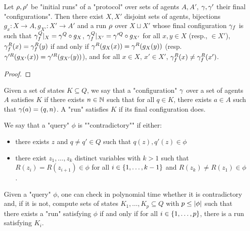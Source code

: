 \begin{lemma}[Copycat]\label{lem:copycat}
	Let $\rho, \rho'$ be "initial runs" of a "protocol" over sets of agents $A, A'$, $\gamma, \gamma'$ their final "configurations".
	Then there exist $X, X'$ disjoint sets of agents, bijections $g_x: X\to A, g_{X'} : X' \to A'$ and a run $\rho$ over $X \sqcup X'$ whose final configuration $\gamma_f$ is such that $\gamma^Q_f|_X = \gamma^Q \circ g_X$, $\gamma^Q_f|_{X'} = \gamma'^Q \circ g_{X'}$ for all $x, y \in X$ (resp., $\in X'$), $\gamma_f^R(x) = \gamma_f^R(y)$ if and only if $\gamma^R(g_X(x)) = \gamma^R(g_X(y))$ (resp. $\gamma'^R(g_{X'}(x)) = \gamma'^R(g_{X'}(y))$), and for all $x \in X$, $x' \in X'$, $\gamma_f^R(x) \neq \gamma_f^R(x')$.
\end{lemma}

\begin{proof}
\end{proof}

\begin{definition}
	Given a set of states $K \subseteq Q$, we say that a "configuration" $\gamma$ over a set of agents $A$ satisfies $K$ if there exists $n \in \mathbb{N}$ such that for all $q \in K$, there exists $a \in A$ such that $\gamma(a) = (q,n)$.
	A "run" satisfies $K$ if its final configuration does.
\end{definition}

\begin{lemma}
	We say that a "query" $\phi$ is ""contradictory"" if either:
	\begin{itemize}
		\item there exists $z$ and $q \neq q' \in Q$ such that $q(z), q'(z) \in \phi$
		
		\item there exist $z_1, \ldots, z_k$ distinct variables with $k>1$ such that $R(z_{i}) = R(z_{i+1}) \in \phi$ for all $i \in \{1,\ldots,k-1\}$ and $R(z_k) \neq R(z_1) \in \phi$.
	\end{itemize}
	 
	
	Given a "query" $\phi$, one can check in polynomial time whether it is contradictory and, if it is not, compute sets of states $K_1, \ldots, K_p \subseteq Q$ with $p \leq |\phi|$ such that there exists a "run" satisfying $\phi$ if and only if for all $i \in \{1,\ldots, p\}$, there is a run satisfying $K_i$. 
\end{lemma}

